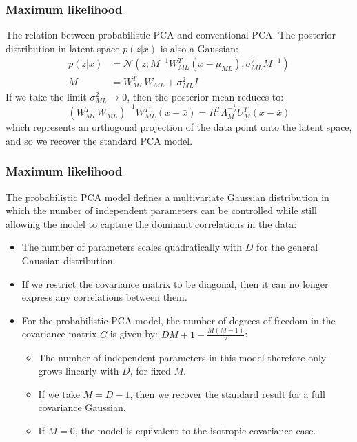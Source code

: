 \documentclass{beamer}
\begin{document}
\begin{frame}
    \frametitle{Maximum likelihood}
    The relation between probabilistic PCA and conventional PCA. The posterior distribution in latent space $p(z|x)$ is also a Gaussian:
    \begin{align*}
        p(z|x)&=\mathcal{N}(z;M^{-1}W_{ML}^{T}(x-\mu_{ML}),\sigma^{2}_{ML}M^{-1}) \\
        M&=W_{ML}^{T}W_{ML}+\sigma^{2}_{ML}I
    \end{align*}
    If we take the limit $\sigma^{2}_{ML}\to{}0$, then the posterior mean reduces to:
    \begin{equation*}
        (W_{ML}^{T}W_{ML})^{-1}W_{ML}^{T}(x-\bar{x})=R^{T}\Lambda_{M}^{-\frac{1}{2}}U_{M}^{T}(x-\bar{x})
    \end{equation*}
    which represents an orthogonal projection of the data point onto the latent space, and so we recover the standard PCA model.
\end{frame}

\begin{frame}
    \frametitle{Maximum likelihood}
    The probabilistic PCA model defines a multivariate Gaussian distribution in which the number of independent parameters can be controlled while still allowing the model to capture the dominant correlations in the data:
    \begin{itemize}
        \item The number of parameters scales quadratically with $D$ for the general Gaussian distribution.
        \item If we restrict the covariance matrix to be diagonal, then it can no longer express any correlations between them.
        \item For the probabilistic PCA model, the number of degrees of freedom in the covariance matrix $C$ is given by: $DM+1-\frac{M(M-1)}{2}$:
        \begin{itemize}
            \item The number of independent parameters in this model therefore only grows linearly with $D$, for fixed $M$.
            \item If we take $M=D-1$, then we recover the standard result for a full covariance Gaussian.
            \item If $M=0$, the model is equivalent to the isotropic covariance case.
        \end{itemize}
    \end{itemize}
\end{frame}
\end{document}
